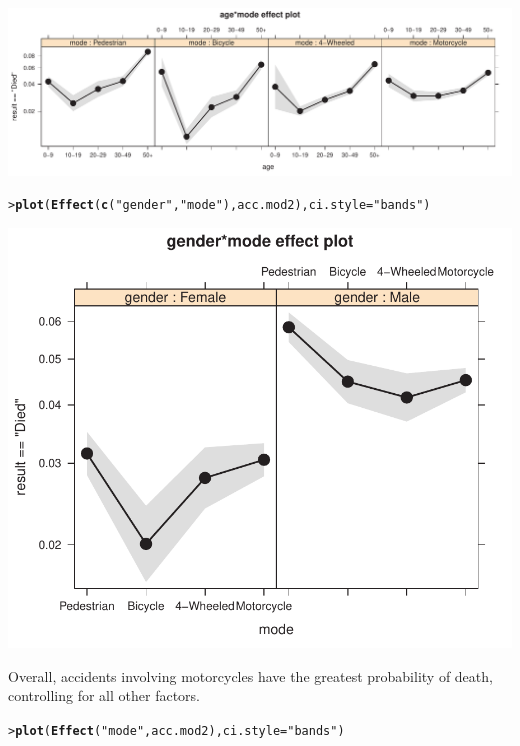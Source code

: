 \documentclass[10pt]{report}\usepackage[]{graphicx}\usepackage[]{color}
\makeatletter
\newcommand{\hlstr}[1]{\textcolor[rgb]{0.192,0.494,0.8}{#1}}%
\newcommand{\hlstd}[1]{\textcolor[rgb]{0.345,0.345,0.345}{#1}}%
\newcommand{\hlkwc}[1]{\textcolor[rgb]{0.333,0.667,0.333}{#1}}%
\newcommand{\hlkwd}[1]{\textcolor[rgb]{0.737,0.353,0.396}{\textbf{#1}}}%
\newenvironment{kframe}{%
 \def\at@end@of@kframe{}%
 \ifinner\ifhmode%
  \def\at@end@of@kframe{\end{minipage}}%
  \begin{minipage}{\columnwidth}%
 \fi\fi%
 \def\FrameCommand##1{\hskip\@totalleftmargin \hskip-\fboxsep
 \colorbox{shadecolor}{##1}\hskip-\fboxsep
     \hskip-\linewidth \hskip-\@totalleftmargin \hskip\columnwidth}%
 \MakeFramed {\advance\hsize-\width
   \@totalleftmargin\z@ \linewidth\hsize
   \@setminipage}}%
 {\par\unskip\endMakeFramed%
 \at@end@of@kframe}
\newenvironment{knitrout}{}{} %
\renewenvironment{knitrout}{\small\renewcommand{\baselinestretch}{.85}}{} %
\makeatother
\begin{document}
\begin{Exercises}
\begin{enumerate*}
\begin{ans}
\begin{knitrout}
\centerline{\includegraphics[width=.8\textwidth]{soln/fig/ex7_7d2-1} }



\end{knitrout}
\begin{knitrout}\footnotesize
{}\color{fgcolor}\begin{kframe}
\begin{alltt}
\hlstd{> }\hlkwd{plot}\hlstd{(}\hlkwd{Effect}\hlstd{(}\hlkwd{c}\hlstd{(}\hlstr{"gender"}\hlstd{,} \hlstr{"mode"}\hlstd{), acc.mod2),} \hlkwc{ci.style}\hlstd{=}\hlstr{"bands"}\hlstd{)}
\end{alltt}
\end{kframe}

\centerline{\includegraphics[width=.5\textwidth]{soln/fig/ex7_7d3-1} }



\end{knitrout}
    Overall, accidents involving motorcycles have the greatest probability of death, 
    controlling for all other factors.
\begin{knitrout}\footnotesize
{}\color{fgcolor}\begin{kframe}
\begin{alltt}
\hlstd{> }\hlkwd{plot}\hlstd{(}\hlkwd{Effect}\hlstd{(}\hlstr{"mode"}\hlstd{, acc.mod2),} \hlkwc{ci.style}\hlstd{=}\hlstr{"bands"}\hlstd{)}
\end{alltt}
\end{kframe}


\end{knitrout}
\end{ans}
\end{enumerate*}
\end{Exercises}
\end{document}
